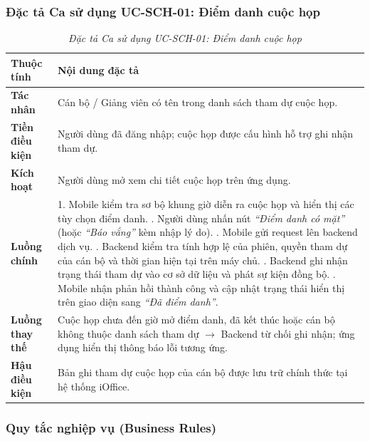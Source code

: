\subsubsection{Đặc tả Ca sử dụng UC-SCH-01: Điểm danh cuộc họp}

\begin{table}[H]
\centering
\renewcommand{\arraystretch}{1.25}
\begin{tabularx}{\textwidth}{|p{3.2cm}|X|}
\hline
\textbf{Thuộc tính} & \textbf{Nội dung đặc tả} \\
\hline
\textbf{Tác nhân} & Cán bộ / Giảng viên có tên trong danh sách tham dự cuộc họp. \\
\hline
\textbf{Tiền điều kiện} & Người dùng đã đăng nhập; cuộc họp được cấu hình hỗ trợ ghi nhận tham dự. \\
\hline
\textbf{Kích hoạt} & Người dùng mở xem chi tiết cuộc họp trên ứng dụng. \\
\hline
\textbf{Luồng chính} & 
1. Mobile kiểm tra sơ bộ khung giờ diễn ra cuộc họp và hiển thị các tùy chọn điểm danh. \newline
2. Người dùng nhấn nút \textit{``Điểm danh có mặt''} (hoặc \textit{``Báo vắng''} kèm nhập lý do). \newline
3. Mobile gửi request lên backend dịch vụ. \newline
4. Backend kiểm tra tính hợp lệ của phiên, quyền tham dự của cán bộ và thời gian hiện tại trên máy chủ. \newline
5. Backend ghi nhận trạng thái tham dự vào cơ sở dữ liệu và phát sự kiện đồng bộ. \newline
6. Mobile nhận phản hồi thành công và cập nhật trạng thái hiển thị trên giao diện sang \textit{``Đã điểm danh''}. \\
\hline
\textbf{Luồng thay thế} & Cuộc họp chưa đến giờ mở điểm danh, đã kết thúc hoặc cán bộ không thuộc danh sách tham dự $\rightarrow$ Backend từ chối ghi nhận; ứng dụng hiển thị thông báo lỗi tương ứng. \\
\hline
\textbf{Hậu điều kiện} & Bản ghi tham dự cuộc họp của cán bộ được lưu trữ chính thức tại hệ thống iOffice. \\
\hline
\end{tabularx}
\caption{\textit{Đặc tả Ca sử dụng UC-SCH-01: Điểm danh cuộc họp}}
\label{tab:uc_sch_01}
\end{table}

\subsubsection{Quy tắc nghiệp vụ (Business Rules)}

